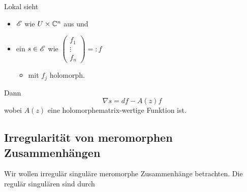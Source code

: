 \begin{rem}
  Lokal sieht
  \begin{itemize}
    \item $\mathscr{E}$ wie $U\times\mathbb{C}^n$ aus und
    \item ein $s\in\mathscr{E}$ wie 
      $\begin{pmatrix}f_{1}\\ \vdots\\ f_{n} \end{pmatrix}=:f$
      \begin{itemize}
        \item mit $f_j$ holomorph.
      \end{itemize}
  \end{itemize}
  Dann
  \[
    \nabla s=df - A(z)f
  \]
  wobei $A(z)$ eine holomorphe\TODO[meromorph?] matrix-wertige Funktion ist.
  \begin{comment}
    Wollen diese Klassifizieren. Klassifiziere diese durch die Lösung von
    $\nabla s=0$. Dies ist eine DGL (ODE).
  \end{comment}
\end{rem}
\begin{comment}
  \TODO[$A^0=\dots$]
  \begin{defn}
    \begin{itemize}
      \item $G\{z\}:=\GL_n(\C\{z\})$ \emph{locale analytischen Gauge
        Tranformationen}
        \begin{itemize}
          \item mit Wirkung $F[A^0]=(dF)F^{-1}+FA^0F^{-1}$
        \end{itemize}
      \item $\hat G:=\GL_n(\C\llbracket z\rrbracket)$ \emph{formale
        Tranformationen}
    \end{itemize}
    definiere
    \[
      \Syst(A^0)
      :=\left\{A \mid A=\hat F[A^0]\text{ für ein }\hat F\in\hat G\right\}
    \]
  \end{defn}
  \begin{center}
    \textbf{Wir sind interessiert in $\Syst(A^0)/\C\{z\}$}
  \end{center}
\end{comment}
\subsection{Irregularität von meromorphen Zusammenhängen} %
Wir wollen irregulär singuläre meromorphe Zusammenhänge betrachten. Die regulär
singulären sind durch \TODO

